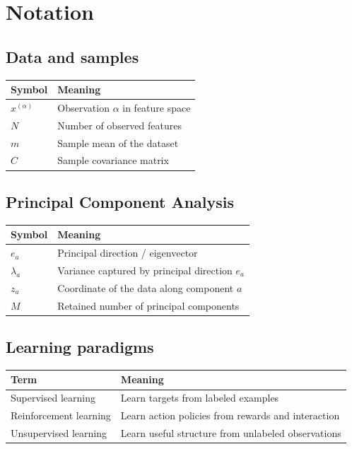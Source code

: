 \section*{Notation}

\subsection*{Data and samples}

\begin{tabular}{@{}ll@{}}
  \toprule
  \textbf{Symbol} & \textbf{Meaning} \\
  \midrule
  $x^{(\alpha)}$ & Observation $\alpha$ in feature space \\
  $N$ & Number of observed features \\
  $m$ & Sample mean of the dataset \\
  $C$ & Sample covariance matrix \\
  \bottomrule
\end{tabular}

\subsection*{Principal Component Analysis}

\begin{tabular}{@{}ll@{}}
  \toprule
  \textbf{Symbol} & \textbf{Meaning} \\
  \midrule
  $e_a$ & Principal direction / eigenvector \\
  $\lambda_a$ & Variance captured by principal direction $e_a$ \\
  $z_a$ & Coordinate of the data along component $a$ \\
  $M$ & Retained number of principal components \\
  \bottomrule
\end{tabular}

\subsection*{Learning paradigms}

\begin{tabular}{@{}ll@{}}
  \toprule
  \textbf{Term} & \textbf{Meaning} \\
  \midrule
  Supervised learning & Learn targets from labeled examples \\
  Reinforcement learning & Learn action policies from rewards and interaction \\
  Unsupervised learning & Learn useful structure from unlabeled observations \\
  \bottomrule
\end{tabular}

